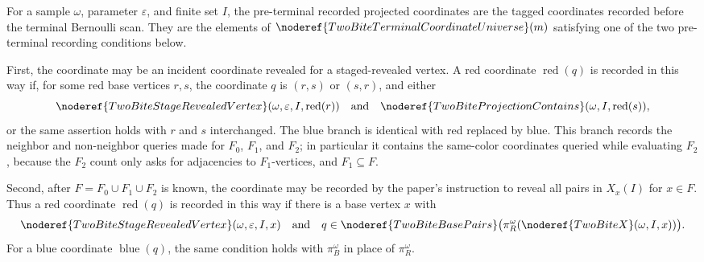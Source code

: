 \begin{definition}
For a sample \(\omega\), parameter \(\varepsilon\), and finite set \(I\), the
pre-terminal recorded projected coordinates are the tagged coordinates recorded
before the terminal Bernoulli scan.  They are the elements of
\(\noderef{TwoBiteTerminalCoordinateUniverse}(m)\) satisfying one of the two
pre-terminal recording conditions below.

First, the coordinate may be an incident coordinate revealed for a
staged-revealed vertex.  A red coordinate \(\operatorname{red}(q)\) is recorded
in this way if, for some red base vertices \(r,s\), the coordinate \(q\) is
\((r,s)\) or \((s,r)\), and either
\[
\noderef{TwoBiteStageRevealedVertex}
(\omega,\varepsilon,I,\operatorname{red}(r))
\quad\text{and}\quad
\noderef{TwoBiteProjectionContains}
(\omega,I,\operatorname{red}(s)),
\]
or the same assertion holds with \(r\) and \(s\) interchanged.  The blue branch
is identical with red replaced by blue.  This branch records the neighbor and
non-neighbor queries made for \(F_0\), \(F_1\), and \(F_2\); in particular it
contains the same-color coordinates queried while evaluating \(F_2\), because
the \(F_2\) count only asks for adjacencies to \(F_1\)-vertices, and
\(F_1\subseteq F\).

Second, after \(F=F_0\cup F_1\cup F_2\) is known, the coordinate may be
recorded by the paper's instruction to reveal all pairs in \(X_x(I)\) for
\(x\in F\).  Thus a red coordinate \(\operatorname{red}(q)\) is recorded in
this way if there is a base vertex \(x\) with
\[
\noderef{TwoBiteStageRevealedVertex}(\omega,\varepsilon,I,x)
\quad\text{and}\quad
q\in\noderef{TwoBiteBasePairs}
\bigl(\pi_R^\omega(\noderef{TwoBiteX}(\omega,I,x))\bigr).
\]
For a blue coordinate \(\operatorname{blue}(q)\), the same condition holds
with \(\pi_B^\omega\) in place of \(\pi_R^\omega\).
\end{definition}
